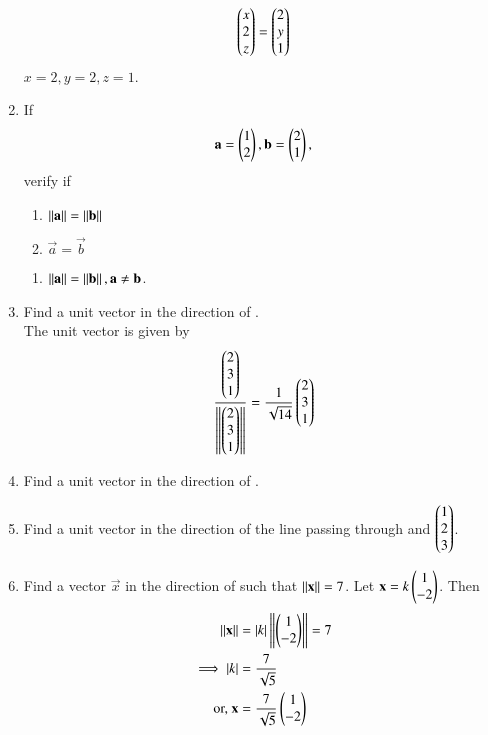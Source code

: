 \begin{enumerate}[label=\arabic*.,ref=\thesubsection.\theenumi]
\begin{align}
\begin{pmatrix}x\\2\\z\end{pmatrix}= \begin{pmatrix}2\\y\\1\end{pmatrix}
\end{align}
%
\solution $x = 2, y=2, z=1$.
%
\item If
\begin{align}
\mathbf{a} = \begin{pmatrix}1\\2\end{pmatrix}, \mathbf{b} = \begin{pmatrix}2\\1\end{pmatrix},
\end{align}
verify if  
\begin{enumerate}
\item $\left\lVert\mathbf{a}\right\rVert=\left\lVert\mathbf{b}\right\rVert$

\item $\vec{a}=\vec{b}$
\end{enumerate}
%
\solution
\begin{enumerate}
\item $\left\lVert\mathbf{a}\right\rVert=\left\lVert\mathbf{b}\right\rVert,\mathbf{a}\ne\mathbf{b}$.
\end{enumerate}
\item Find a unit vector in the  direction of .
%
\\
\solution The unit vector is given by 
\begin{align}
\frac{\begin{pmatrix}2\\3\\1\end{pmatrix}}{\left\lVert\begin{pmatrix}2\\3\\1\end{pmatrix}\right\rVert} = \frac{1}{\sqrt{14}}\begin{pmatrix}2\\3\\1\end{pmatrix}
\end{align}
%
%
\item Find a unit vector in the direction of .
%
\item Find a unit vector in the direction of the line passing through  and $\begin{pmatrix}1\\2\\3\end{pmatrix}$.
%
\item Find a vector $\vec{x}$ in the direction of  such that $\left\lVert\mathbf{x}\right\rVert = 7$.
%
\solution Let $\mathbf{x} = k\begin{pmatrix}1\\-2\end{pmatrix}$.  Then 
%
\begin{align}
\left\lVert\mathbf{x}\right\rVert &= \left\vert k\right\vert\left\lVert\begin{pmatrix}1\\-2\end{pmatrix}\right\rVert= 7
\\
\implies \left\vert k\right\vert &= \frac{7}{\sqrt{5}}
\\
\text{or, } \mathbf{x} &= \frac{7}{\sqrt{5}}\begin{pmatrix}1\\-2\end{pmatrix}
\end{align}
%


\end{enumerate}
